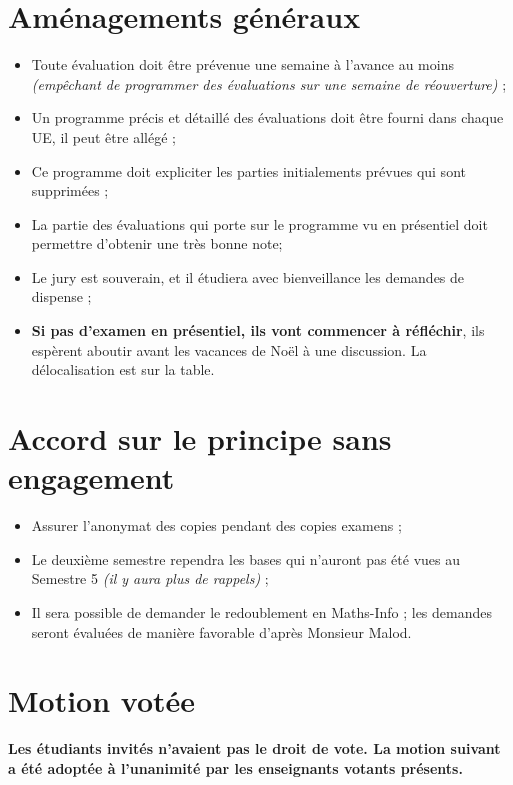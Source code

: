\documentclass{article}
\begin{document}
\section{Aménagements généraux}
\begin{itemize}
    \item Toute évaluation doit être prévenue une semaine à l'avance au moins \textit{(empêchant de programmer des évaluations sur une semaine de réouverture)} ;
    \item Un programme précis et détaillé des évaluations doit être fourni dans chaque UE, il peut être allégé ;
    \item Ce programme doit expliciter les parties initialements prévues qui sont supprimées ;
    \item La partie des évaluations qui porte sur le programme vu en présentiel doit permettre d'obtenir une très bonne note;
    \item Le jury est souverain, et il étudiera avec bienveillance les demandes de dispense ;
    \item \textbf{Si pas d'examen en présentiel, ils vont commencer à réfléchir}, ils espèrent aboutir avant les vacances de Noël à une discussion. La délocalisation est sur la table.
\end{itemize}

\section{Accord sur le principe sans engagement}

\begin{itemize}
    \item Assurer l'anonymat des copies pendant des copies examens ; 
    \item Le deuxième semestre rependra les bases qui n'auront pas été vues au Semestre 5 \textit{(il y aura plus de rappels)} ;
    \item Il sera possible de demander le redoublement en Maths-Info ; les demandes seront évaluées de manière favorable d'après Monsieur Malod.
\end{itemize}

\section{Motion votée}
\textbf{Les étudiants invités n'avaient pas le droit de vote. La motion suivant a été adoptée à l'unanimité par les enseignants votants présents.}\\
\end{document}
